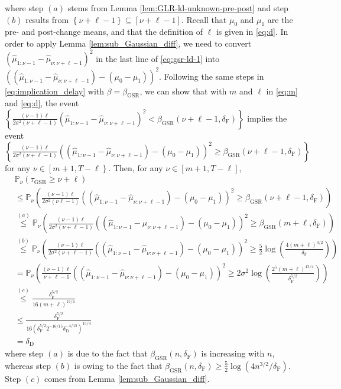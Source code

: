 \documentclass[12pt]{interact}
\newcommand{\lp}{\left(}
\newcommand{\rp}{\right)}
\newcommand{\lb}{\left[}
\newcommand{\rb}{\right]}
\newcommand{\lbp}{\left\{}
\newcommand{\rbp}{\right\}}
\newcommand{\mrm}{\mathrm}
\renewcommand{\Pr}{\mathbb{P}}
\theoremstyle{plain}
\begin{document}
%
where step $(a)$ stems from Lemma \ref{lem:GLR-kl-unknown-pre-post} and step $(b)$ results from $\lbp\nu+ \ell - 1\rbp\subseteq\lb \nu+ \ell - 1 \rb$. Recall that $\mu_{0}$ and $\mu_{1}$ are the pre- and post-change means, and that the definition of $\ell$ is given in \eqref{eq:d}. In order to apply Lemma \ref{lem:sub_Gaussian_diff}, we need to convert $\lp\hat{\mu}_{1:\nu-1}-\hat{\mu}_{\nu:\nu+\ell-1}\rp^{2}$ in the last line of \eqref{eq:gsr-ld-1} into $\lp\lp\hat{\mu}_{1:\nu-1}-\hat{\mu}_{\nu:\nu+\ell-1}\rp-\lp\mu_{0}-\mu_{1}\rp\rp^{2}$. Following the same steps in \eqref{eq:implication_delay} with $\beta = \beta_{\mrm{GSR}}$, we can show that with $m$ and $\ell$ in \eqref{eq:m} and \eqref{eq:d}, the event $\lbp\frac{\lp\nu-1\rp \ell}{2\sigma^{2}\lp\nu+\ell-1\rp}\lp\hat{\mu}_{1:\nu-1}-\hat{\mu}_{\nu:\nu+\ell-1}\rp^{2}<\beta_{\mrm{GSR}}\lp \nu+\ell-1,\delta_{\mrm{F}}\rp\rbp$ implies the event $\lbp\frac{\lp\nu-1\rp \ell}{2\sigma^{2}\lp\nu+\ell-1\rp}\lp\lp\hat{\mu}_{1:\nu-1}-\hat{\mu}_{\nu:\nu+\ell-1}\rp-\lp\mu_{0}-\mu_{1}\rp\rp^{2}\geq\beta_{\mrm{GSR}}\lp \nu+\ell-1,\delta_{\mrm{F}}\rp\rbp$ for any $\nu\in\lb m+1,T-\ell\rbp$.
Then, for any $\nu\in\lb m+1,T-\ell\rb$,
%
\begin{align}\nonumber
    &\Pr_{\nu}\lp\tau_{\mrm{GSR}}\geq\nu+\ell\rp\\\nonumber
    &\leq\Pr_{\nu}\lp\frac{\lp\nu-1\rp \ell}{2\sigma^{2}\lp\nu\ell-1\rp}\lp\lp\hat{\mu}_{1:\nu-1}-\hat{\mu}_{\nu:\nu+\ell-1}\rp-\lp\mu_{0}-\mu_{1}\rp\rp^{2}\geq\beta_{\mrm{GSR}}\lp\nu+\ell-1,\delta_{\mrm{F}}\rp\rp\\\nonumber
    &\overset{(a)}{\leq}\Pr_{\nu}\lp\frac{\lp\nu-1\rp \ell}{2\sigma^{2}\lp\nu+\ell-1\rp}\lp\lp\hat{\mu}_{1:\nu-1}-\hat{\mu}_{\nu:\nu+\ell-1}\rp-\lp\mu_{0}-\mu_{1}\rp\rp^{2}\geq\beta_{\mrm{GSR}}\lp m+\ell,\delta_{\mrm{F}}\rp\rp\\\nonumber
    &\overset{(b)}{\leq}\Pr_{\nu}\lp\frac{\lp\nu-1\rp \ell}{2\sigma^{2}\lp\nu+\ell-1\rp}\lp\lp\hat{\mu}_{1:\nu-1}-\hat{\mu}_{\nu:\nu+\ell-1}\rp-\lp\mu_{0}-\mu_{1}\rp\rp^{2}\geq\frac{5}{2}\log\lp\frac{4\lp m+\ell\rp^{3/2}}{\delta_{\mrm{F}}}\rp\rp\\\nonumber
    &=\Pr_{\nu}\lp\frac{\lp\nu-1\rp \ell}{\nu+\ell-1}\lp\lp\hat{\mu}_{1:\nu-1}-\hat{\mu}_{\nu:\nu+\ell-1}\rp-\lp\mu_{0}-\mu_{1}\rp\rp^{2}\geq2\sigma^{2}\log\lp\frac{2^{5}\lp m+\ell \rp^{15/4}}{\delta_{\mrm{F}}^{5/2}}\rp\rp\\\nonumber
    &\overset{(c)}{\leq}\frac{\delta_{\mrm{F}}^{5/2}}{16\lp m+\ell\rp^{15/4}}\\\nonumber
    &\leq\frac{\delta_{\mrm{F}}^{5/2}}{16\lp\delta_{\mrm{F}}^{5/2}2^{-16/15}\delta^{-4/15}_{\mrm{D}}\rp^{15/4}}\\
    &=\delta_{\mrm{D}}
\end{align}
%
where step $(a)$ is due to the fact that $\beta_{\mrm{GSR}}\lp n,\delta_{\mrm{F}}\rp$ is increasing with $n$, whereas step $(b)$ is owing to the fact that $\beta_{\mrm{GSR}}\lp n,\delta_{\mrm{F}}\rp\geq\frac{5}{2}\log\lp4n^{3/2}/\delta_{\mrm{F}}\rp$. Step $(c)$ comes from Lemma \ref{lem:sub_Gaussian_diff}. 
\end{document}
